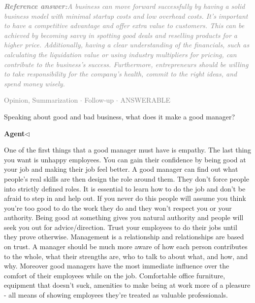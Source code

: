 \documentclass[a4paper,11pt]{article}
\begin{document}
\begin{refanswerenv}
{\footnotesize\textit{\textcolor{gray}{\textbf{Reference answer:}\enspace A business can move forward successfully by having a solid business model with minimal startup costs and low overhead costs. It's important to have a competitive advantage and offer extra value to customers. This can be achieved by becoming savvy in spotting good deals and reselling products for a higher price. Additionally, having a clear understanding of the financials, such as calculating the liquidation value or using industry multipliers for pricing, can contribute to the business's success. Furthermore, entrepreneurs should be willing to take responsibility for the company's health, commit to the right ideas, and spend money wisely.}}}
\end{refanswerenv}
\vspace{0.5em}
\hfill{\tiny\textcolor{gray}{Opinion, Summarization $\cdot$ Follow-up $\cdot$ ANSWERABLE}}
\begin{userbubble}
Speaking about good and bad business, what does it make a good manager?
\end{userbubble}
\noindent\hfill{\small\textcolor{agentcolor}{\textbf{Agent\enspace$\triangleleft$}}}
\begin{agentbubble}
One of the first things that a good manager must have is empathy. The last thing you want is unhappy employees. You can gain their confidence by being good at your job and making their job feel better. A good manager can find out what people's real skills are then design the role around them. They don't force people into strictly defined roles. It is essential to learn how to do the job and don't be afraid to step in and help out. If you never do this people will assume you think you're too good to do the work they do and they won't respect you or your authority. Being good at something gives you natural authority and people will seek you out for advice/direction. Trust your employees to do their jobs until they prove otherwise. Management is a relationship and relationships are based on trust. A manager should be much more aware of how each person contributes to the whole, what their strengths are, who to talk to about what, and how, and why. Moreover  good managers have the most immediate influence over the comfort of their employees while on the job. Comfortable office furniture, equipment that doesn't suck, amenities to make being at work more of a pleasure - all means of showing employees they're treated as valuable professionals.
\end{agentbubble}
\end{document}

